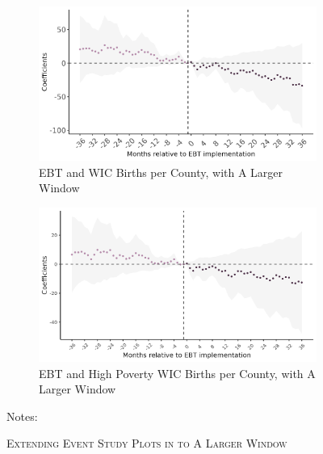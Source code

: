 \begin{figure}[!htbp]
\begin{subfigure}[t]{.5\textwidth}
		\label{mk_es2}
	\end{subfigure}
	\begin{subfigure}[t]{.5\textwidth}
		\centering
		\includegraphics[width=\textwidth]{fig8_mk_long.png}  
		\caption{EBT and WIC Births per County, with A Larger Window}
		\label{mk_es3}
	\end{subfigure}
	\begin{subfigure}[t]{.5\textwidth}
		\centering
		\includegraphics[width=\textwidth]{fig9_mk_long.png}  
		\caption{EBT and High Poverty WIC Births per County, with A Larger Window}
		\label{mk_es4}
	\end{subfigure}
	\caption{\textsc{Extending Event Study Plots in \cite{meckel2020cure} to A Larger Window}}
	\label{mk_es}
	\footnotesize
	\vspace{6pt}
	\vspace{4pt}
	Notes: 
\end{figure}


